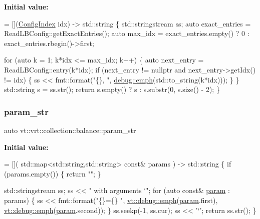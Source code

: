 {\bfseries Initial value\+:}
\begin{DoxyCode}
= [](\hyperlink{namespacevt_1_1vrt_1_1collection_1_1balance_ac1bb9eee8129549177880dbb4e5f6a34}{ConfigIndex} idx) -> std::string \{
  std::stringstream ss;
  \textcolor{keyword}{auto} exact\_entries = ReadLBConfig::getExactEntries();
  \textcolor{keyword}{auto} max\_idx = exact\_entries.empty() ? 0 : exact\_entries.rbegin()->first;

  \textcolor{keywordflow}{for} (\textcolor{keyword}{auto} k = 1; k*idx <= max\_idx; k++) \{
    \textcolor{keyword}{auto} next\_entry = ReadLBConfig::entry(k*idx);
    \textcolor{keywordflow}{if} (next\_entry != \textcolor{keyword}{nullptr} and next\_entry->getIdx() != idx) \{
      ss << fmt::format(\textcolor{stringliteral}{"\{\}, "}, \hyperlink{namespacevt_1_1debug_add365336d7aa2053b5b7588ccad48ac7}{debug::emph}(std::to\_string(k*idx)));
    \}
  \}
  std::string s = ss.str();
  \textcolor{keywordflow}{return} s.empty() ? s : s.substr(0, s.size() - 2);
\}
\end{DoxyCode}
\mbox{\label{namespacevt_1_1vrt_1_1collection_1_1balance_aaed7e09146a45c2932ca185a55161723}} 
\subsubsection{\texorpdfstring{param\+\_\+str}{param\_str}}
{\footnotesize\ttfamily auto vt\+::vrt\+::collection\+::balance\+::param\+\_\+str}

{\bfseries Initial value\+:}
\begin{DoxyCode}
= [](
  std::map<std::string,std::string> \textcolor{keyword}{const}& params
) -> std::string \{
  \textcolor{keywordflow}{if} (params.empty()) \{
    \textcolor{keywordflow}{return} \textcolor{stringliteral}{""};
  \}

  std::stringstream ss;
  ss << \textcolor{stringliteral}{" with arguments `"};
  \textcolor{keywordflow}{for} (\textcolor{keyword}{auto} \textcolor{keyword}{const}& \hyperlink{namespacevt_1_1config_a6bd1d6215bda0d8ca02811798399f689ab9f079503fc8bbc11679d6dd6d2a2d16}{param} : params) \{
    ss << fmt::format(\textcolor{stringliteral}{"\{\}=\{\} "},
      \hyperlink{namespacevt_1_1debug_add365336d7aa2053b5b7588ccad48ac7}{vt::debug::emph}(\hyperlink{namespacevt_1_1config_a6bd1d6215bda0d8ca02811798399f689ab9f079503fc8bbc11679d6dd6d2a2d16}{param}.first),
      \hyperlink{namespacevt_1_1debug_add365336d7aa2053b5b7588ccad48ac7}{vt::debug::emph}(\hyperlink{namespacevt_1_1config_a6bd1d6215bda0d8ca02811798399f689ab9f079503fc8bbc11679d6dd6d2a2d16}{param}.second));
  \}
  ss.seekp(-1, ss.cur);
  ss << \textcolor{charliteral}{'`'};
  \textcolor{keywordflow}{return} ss.str();
\}
\end{DoxyCode}
